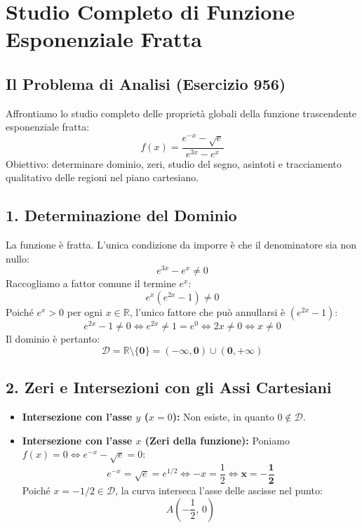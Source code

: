 \documentclass[11pt,a4paper,oneside]{report}
\begin{document}
\chapter{Studio Completo di Funzione Esponenziale Fratta}

\section{Il Problema di Analisi (Esercizio 956)}
Affrontiamo lo studio completo delle proprietà globali della funzione trascendente esponenziale fratta:
\begin{equation}
    f(x) = \frac{e^{-x} - \sqrt{e}}{e^{3x} - e^x}
\end{equation}
Obiettivo: determinare dominio, zeri, studio del segno, asintoti e tracciamento qualitativo delle regioni nel piano cartesiano.

\section{1. Determinazione del Dominio}
La funzione è fratta. L'unica condizione da imporre è che il denominatore sia non nullo:
\begin{equation*}
    e^{3x} - e^x \neq 0
\end{equation*}
Raccogliamo a fattor comune il termine $e^x$:
\begin{equation*}
    e^x(e^{2x} - 1) \neq 0
\end{equation*}
Poiché $e^x > 0$ per ogni $x \in \mathbb{R}$, l'unico fattore che può annullarsi è $(e^{2x} - 1)$:
\begin{equation*}
    e^{2x} - 1 \neq 0 \iff e^{2x} \neq 1 = e^0 \iff 2x \neq 0 \iff x \neq 0
\end{equation*}
Il dominio è pertanto:
\begin{equation}
    \mathbf{\mathcal{D} = \mathbb{R} \setminus \{0\} = (-\infty, 0) \cup (0, +\infty)}
\end{equation}

\section{2. Zeri e Intersezioni con gli Assi Cartesiani}
\begin{itemize}
    \item \textbf{Intersezione con l'asse $y$ ($x = 0$):} Non esiste, in quanto $0 \notin \mathcal{D}$.
    \item \textbf{Intersezione con l'asse $x$ (Zeri della funzione):}
    Poniamo $f(x) = 0 \iff e^{-x} - \sqrt{e} = 0$:
    \begin{equation*}
        e^{-x} = \sqrt{e} = e^{1/2} \iff -x = \frac{1}{2} \iff \mathbf{x = -\frac{1}{2}}
    \end{equation*}
    Poiché $x = -1/2 \in \mathcal{D}$, la curva interseca l'asse delle ascisse nel punto:
    \begin{equation}
        A\left(-\frac{1}{2}, \, 0\right)
    \end{equation}
\end{itemize}
\end{document}
